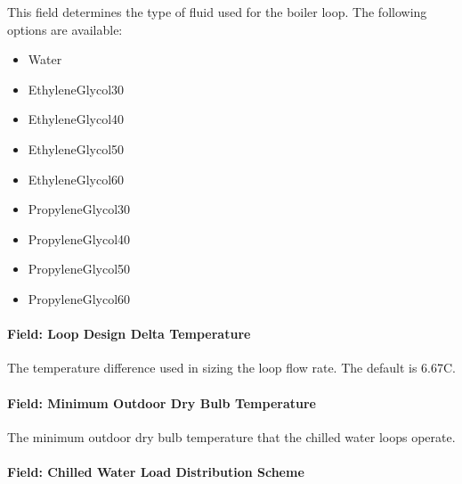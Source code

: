 This field determines the type of fluid used for the boiler loop. The following options are available:

\begin{itemize}
\item
  Water
\item
  EthyleneGlycol30
\item
  EthyleneGlycol40
\item
  EthyleneGlycol50
\item
  EthyleneGlycol60
\item
  PropyleneGlycol30
\item
  PropyleneGlycol40
\item
  PropyleneGlycol50
\item
  PropyleneGlycol60
\end{itemize}

\paragraph{Field: Loop Design Delta Temperature}\label{field-loop-design-delta-temperature}

The temperature difference used in sizing the loop flow rate. The default is 6.67C.

\paragraph{Field: Minimum Outdoor Dry Bulb Temperature}\label{field-minimum-outdoor-dry-bulb-temperature}

The minimum outdoor dry bulb temperature that the chilled water loops operate.

\paragraph{Field: Chilled Water Load Distribution Scheme}\label{field-chilled-water-load-distribution-scheme}

